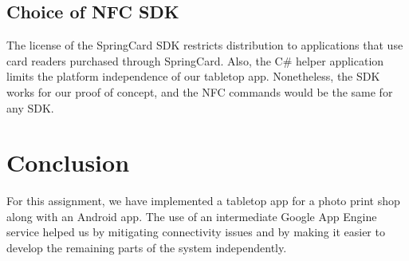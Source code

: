 \documentclass{article}
\begin{document}
\subsection{Choice of NFC SDK}
The license of the SpringCard SDK restricts distribution to applications that use card readers purchased through SpringCard. Also, the C\# helper application limits the platform independence of our tabletop app. Nonetheless, the SDK works for our proof of concept, and the NFC commands would be the same for any SDK.
 
\section{Conclusion}
For this assignment, we have implemented a tabletop app for a photo print shop along with an Android app. The use of an intermediate Google App Engine service helped us by mitigating connectivity issues and by making it easier to develop the remaining parts of the system independently.
 


 
\end{document}
